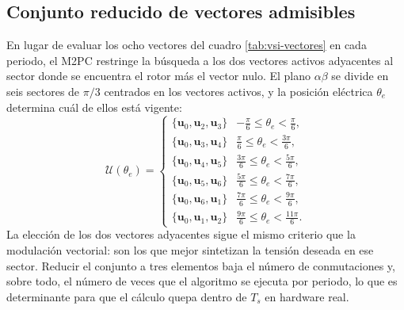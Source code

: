 \documentclass[../../../Tesis_JALS_Maestria.tex]{subfiles}
\begin{document}
\subsection{Conjunto reducido de vectores admisibles}
\label{sec:m2pc-sectores}

En lugar de evaluar los ocho vectores del cuadro \ref{tab:vsi-vectores} en cada periodo, el M2PC restringe la búsqueda a los dos vectores activos adyacentes al sector donde se encuentra el rotor más el vector nulo. El plano $\alpha\beta$ se divide en seis sectores de $\pi/3$ centrados en los vectores activos, y la posición eléctrica $\theta_e$ determina cuál de ellos está vigente:
\begin{equation}
    \mathcal{U}(\theta_e) =
    \begin{cases}
        \{\mathbf{u}_0,\mathbf{u}_2,\mathbf{u}_3\} & -\tfrac{\pi}{6} \le \theta_e < \tfrac{\pi}{6},\\[2pt]
        \{\mathbf{u}_0,\mathbf{u}_3,\mathbf{u}_4\} & \tfrac{\pi}{6} \le \theta_e < \tfrac{3\pi}{6},\\[2pt]
        \{\mathbf{u}_0,\mathbf{u}_4,\mathbf{u}_5\} & \tfrac{3\pi}{6} \le \theta_e < \tfrac{5\pi}{6},\\[2pt]
        \{\mathbf{u}_0,\mathbf{u}_5,\mathbf{u}_6\} & \tfrac{5\pi}{6} \le \theta_e < \tfrac{7\pi}{6},\\[2pt]
        \{\mathbf{u}_0,\mathbf{u}_6,\mathbf{u}_1\} & \tfrac{7\pi}{6} \le \theta_e < \tfrac{9\pi}{6},\\[2pt]
        \{\mathbf{u}_0,\mathbf{u}_1,\mathbf{u}_2\} & \tfrac{9\pi}{6} \le \theta_e < \tfrac{11\pi}{6}.
    \end{cases}
    \label{eq:sectores}
\end{equation}
La elección de los dos vectores adyacentes sigue el mismo criterio que la modulación vectorial: son los que mejor sintetizan la tensión deseada en ese sector. Reducir el conjunto a tres elementos baja el número de conmutaciones y, sobre todo, el número de veces que el algoritmo se ejecuta por periodo, lo que es determinante para que el cálculo quepa dentro de $T_s$ en hardware real.
\end{document}
